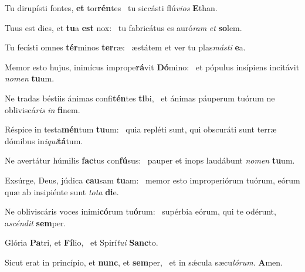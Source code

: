 \item Tu dirupísti fontes, \textbf{et} tor\textbf{rén}tes~\psstar{} tu siccásti flú\textit{vios} \textbf{E}than.
\item Tuus est dies, et \textbf{tu}a \textbf{est} nox:~\psstar{} tu fabricátus es auró\textit{ram} \textit{et} \textbf{so}lem.
\item Tu fecísti omnes \textbf{tér}minos \textbf{ter}ræ:~\psstar{} æstátem et ver tu plas\textit{másti} \textbf{e}a.
\item Memor esto hujus, inimícus imprope\textbf{rá}vit \textbf{Dó}mino:~\psstar{} et pópulus insípiens incitávit \textit{nomen} \textbf{tu}um.
\item Ne tradas béstiis ánimas confi\textbf{tén}tes \textbf{ti}bi,~\psstar{} et ánimas páuperum tuórum ne obliviscá\textit{ris} \textit{in} \textbf{fi}nem.
\item Réspice in testa\textbf{mén}tum \textbf{tu}um:~\psstar{} quia repléti sunt, qui obscuráti sunt terræ dómibus in\textit{iqui}\textbf{tá}tum.
\item Ne avertátur húmilis \textbf{fac}tus con\textbf{fú}sus:~\psstar{} pauper et inops laudábunt \textit{nomen} \textbf{tu}um.
\item Exsúrge, Deus, júdica \textbf{cau}sam \textbf{tu}am:~\psstar{} memor esto improperiórum tuórum, eórum quæ ab insipiénte sunt \textit{tota} \textbf{di}e.
\item Ne obliviscáris voces inimi\textbf{có}rum tu\textbf{ó}rum:~\psstar{} supérbia eórum, qui te odérunt, a\textit{scéndit} \textbf{sem}per.
\item Glória \textbf{Pa}tri, et \textbf{Fí}lio,~\psstar{} et Spirí\textit{tui} \textbf{Sanc}to.
\item Sicut erat in princípio, et \textbf{nunc}, et \textbf{sem}per,~\psstar{} et in sǽcula sæcu\textit{lórum}. \textbf{A}men.
